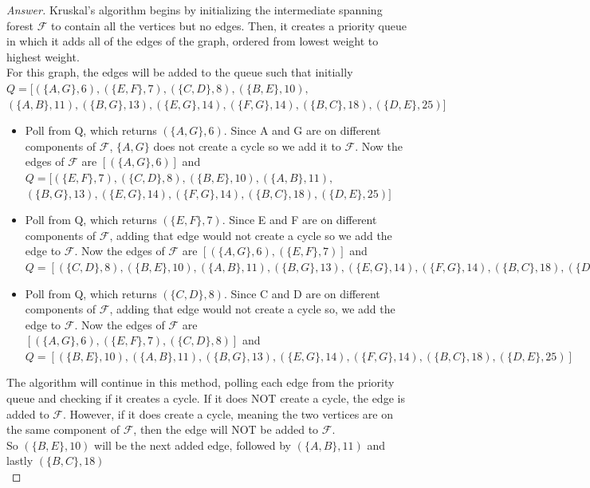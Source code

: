 \documentclass[11pt]{article}
\theoremstyle{definition}
\theoremstyle{definition}
\theoremstyle{definition}
\begin{document}
\begin{proof}[Answer]

Kruskal's algorithm begins by initializing the intermediate spanning forest $\mathcal{F}$ to contain all the vertices but no edges. Then, it creates a priority queue in which it adds all of the edges of the graph, ordered from lowest weight to highest weight. \\
For this graph, the edges will be added to the queue such that initially 
\\
$Q= [ (\{A,G\}, 6), (\{E,F\}, 7), (\{C,D\}, 8), (\{B,E\}, 10), $
\\
 $(\{A,B\}, 11), (\{B,G\}, 13), (\{E,G\}, 14), (\{F,G\}, 14), (\{B,C\}, 18), (\{D,E\}, 25) ]$ \\
\begin{itemize}
\item Poll from Q, which returns $(\{A,G\}, 6)$. Since A and G are on different components of $\mathcal{F}$, $\{A,G\}$ does not create a cycle so we add it to $\mathcal{F}$. Now the edges of $\mathcal{F}$ are $ [(\{A,G\}, 6)]$ and\\
 $Q= [(\{E,F\}, 7), (\{C,D\}, 8), (\{B,E\}, 10), (\{A,B\}, 11),$ \\
$ (\{B,G\}, 13), (\{E,G\}, 14), (\{F,G\}, 14), (\{B,C\}, 18), (\{D,E\}, 25) ]$ \\
\item Poll from Q, which returns $(\{E,F\}, 7)$. Since E and F are on different components of $\mathcal{F}$, adding that edge would not create a cycle so we add the edge to $\mathcal{F}$. Now the edges of $\mathcal{F}$ are $ [(\{A,G\}, 6), (\{E,F\}, 7)]$ and\\ $Q= [(\{C,D\}, 8), (\{B,E\}, 10), (\{A,B\}, 11), (\{B,G\}, 13), (\{E,G\}, 14), (\{F,G\}, 14), (\{B,C\}, 18), (\{D,E\}, 25) ]$ \\
\item Poll from Q, which returns $(\{C,D\}, 8)$. Since C and D are on different components of $\mathcal{F}$,  adding that edge would not create a cycle so, we add the edge to $\mathcal{F}$. Now the edges of $\mathcal{F}$ are $[(\{A,G\}, 6), (\{E,F\}, 7), (\{C,D\}, 8)]$ and  \\
$Q= [ (\{B,E\}, 10), (\{A,B\}, 11), (\{B,G\}, 13), (\{E,G\}, 14), (\{F,G\}, 14), (\{B,C\}, 18), (\{D,E\}, 25) ]$ \\
\end{itemize}

The algorithm will continue in this method, polling each edge from the priority queue and checking if it creates a cycle. If it does NOT create a cycle, the edge is added to $\mathcal{F}$. However, if it does create a cycle, meaning the two vertices are on the same component of $\mathcal{F}$, then the edge will NOT be added to $\mathcal{F}$. \\
So $(\{B,E\}, 10)$ will be the next added edge, followed by  $(\{A,B\}, 11)$ and lastly  $(\{B,C\}, 18)$\\


\end{proof}
\end{document}
